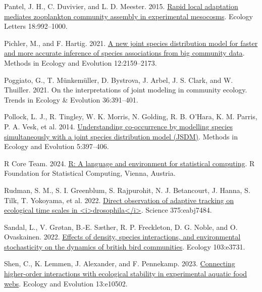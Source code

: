\documentclass[
]{article}
\newlength{\cslhangindent}
\newlength{\cslentryspacingunit} %
\newenvironment{CSLReferences}[2] %
 {%
  \setlength{\parindent}{0pt}
  \ifodd #1
  \let\oldpar\par
  \def\par{\hangindent=\cslhangindent\oldpar}
  \fi
  \setlength{\parskip}{#2\cslentryspacingunit}
 }%
 {}
\begin{document}
\begin{CSLReferences}{0}{0}
\leavevmode{}%
Pantel, J. H., C. Duvivier, and L. D. Meester. 2015. \href{https://doi.org/10.1111/ele.12480}{Rapid local adaptation mediates zooplankton community assembly in experimental mesocosms}. Ecology Letters 18:992--1000.

\leavevmode{}%
Pichler, M., and F. Hartig. 2021. \href{https://doi.org/10.1111/2041-210X.13687}{A new joint species distribution model for faster and more accurate inference of species associations from big community data}. Methods in Ecology and Evolution 12:2159--2173.

\leavevmode{}%
Poggiato, G., T. Münkemüller, D. Bystrova, J. Arbel, J. S. Clark, and W. Thuiller. 2021. On the interpretations of joint modeling in community ecology. Trends in Ecology \& Evolution 36:391--401.

\leavevmode{}%
Pollock, L. J., R. Tingley, W. K. Morris, N. Golding, R. B. O'Hara, K. M. Parris, P. A. Vesk, et al. 2014. \href{https://doi.org/10.1111/2041-210X.12180}{Understanding co-occurrence by modelling species simultaneously with a joint species distribution model (JSDM)}. Methods in Ecology and Evolution 5:397--406.

\leavevmode{}%
R Core Team. 2024. \href{https://www.R-project.org/}{R: A language and environment for statistical computing}. R Foundation for Statistical Computing, Vienna, Austria.

\leavevmode{}%
Rudman, S. M., S. I. Greenblum, S. Rajpurohit, N. J. Betancourt, J. Hanna, S. Tilk, T. Yokoyama, et al. 2022. \href{https://doi.org/10.1126/science.abj7484}{Direct observation of adaptive tracking on ecological time scales in \textless i\textgreater drosophila\textless/i\textgreater{}}. Science 375:eabj7484.

\leavevmode{}%
Sandal, L., V. Grøtan, B.-E. Sæther, R. P. Freckleton, D. G. Noble, and O. Ovaskainen. 2022. \href{https://doi.org/10.1002/ecy.3731}{Effects of density, species interactions, and environmental stochasticity on the dynamics of british bird communities}. Ecology 103:e3731.

\leavevmode{}%
Shen, C., K. Lemmen, J. Alexander, and F. Pennekamp. 2023. \href{https://doi.org/10.1002/ece3.10502}{Connecting higher-order interactions with ecological stability in experimental aquatic food webs}. Ecology and Evolution 13:e10502.


\end{CSLReferences}
\end{document}
